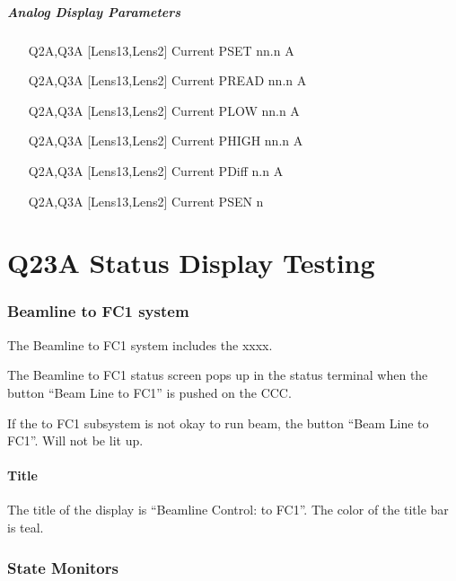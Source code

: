 \documentclass[11pt]{book}		%
\begin{document}
\paragraph{Analog Display Parameters}

\begin{enumerate}
 \item [Q2A,Q3A] [Lens13,Lens2] Current PSET   nn.n A
 \item [Q2A,Q3A] [Lens13,Lens2] Current PREAD  nn.n A
 \item [Q2A,Q3A] [Lens13,Lens2] Current PLOW   nn.n A
 \item [Q2A,Q3A] [Lens13,Lens2] Current PHIGH  nn.n A
 \item [Q2A,Q3A] [Lens13,Lens2] Current PDiff n.n A
 \item [Q2A,Q3A] [Lens13,Lens2] Current PSEN  n
\end{enumerate}




\chapter{Q23A Status Display Testing}


\subsection{Beamline to FC1 system} \label{sect:cyc-op-interface-status-terminal-display-contents-beamline-fc1}

The Beamline to FC1 system includes the xxxx.

The Beamline to FC1 status screen pops up in the status terminal when the button ``Beam Line to FC1'' is pushed on the CCC.

If the to FC1 subsystem is not okay to run beam, the button ``Beam Line to FC1''. Will not be lit up.


\subsubsection{Title}\label{sect:cyc-op-interface-status-terminal-display-contents-beamline-fc1-title}

The title of the display is ``Beamline Control: to FC1''.  The color of the title bar is teal.

\subsection{State Monitors} \label{sect:cyc-op-interface-status-beamline-tofc1-state-monitors}
\end{document}

